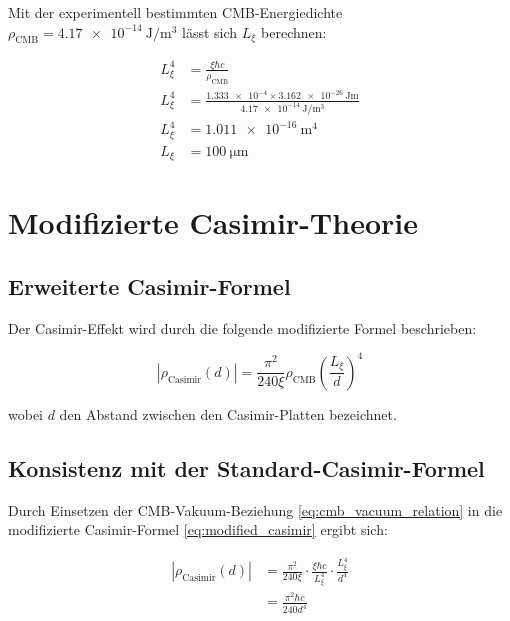 \documentclass[12pt,a4paper]{article}
\begin{document}
	Mit der experimentell bestimmten CMB-Energiedichte \( \rho_{\text{CMB}} = \SI{4.17e-14}{\joule\per\meter^3} \) lässt sich \( L_\xi \) berechnen:
	
	\begin{align}
		L_\xi^4 &= \frac{\xi \hbar c}{\rho_{\text{CMB}}} \label{eq:Lxi_calculation}\\
		L_\xi^4 &= \frac{\num{1.333e-4} \times \SI{3.162e-26}{\joule\meter}}{\SI{4.17e-14}{\joule\per\meter^3}}\\
		L_\xi^4 &= \SI{1.011e-16}{\meter^4}\\
		L_\xi &= \SI{100}{\micro\meter} \label{eq:Lxi_result}
	\end{align}
	
	\section{Modifizierte Casimir-Theorie}
	
	\subsection{Erweiterte Casimir-Formel}
	
	Der Casimir-Effekt wird durch die folgende modifizierte Formel beschrieben:
	
	\begin{equation}
		|\rho_{\text{Casimir}}(d)| = \frac{\pi^2}{240\xi} \rho_{\text{CMB}} \left( \frac{L_\xi}{d} \right)^4 \label{eq:modified_casimir}
	\end{equation}
	
	wobei \( d \) den Abstand zwischen den Casimir-Platten bezeichnet.
	
	\subsection{Konsistenz mit der Standard-Casimir-Formel}
	
	Durch Einsetzen der CMB-Vakuum-Beziehung \eqref{eq:cmb_vacuum_relation} in die modifizierte Casimir-Formel \eqref{eq:modified_casimir} ergibt sich:
	
	\begin{align}
		|\rho_{\text{Casimir}}(d)| &= \frac{\pi^2}{240\xi} \cdot \frac{\xi \hbar c}{L_\xi^4} \cdot \frac{L_\xi^4}{d^4} \label{eq:casimir_substitution}\\
		&= \frac{\pi^2 \hbar c}{240 d^4} \label{eq:standard_casimir_recovered}
	\end{align}
	
\end{document}
